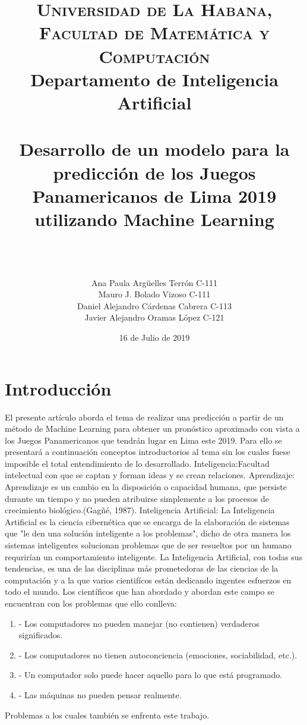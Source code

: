 \documentclass[a4paper,12pt]{article}
\title{	
\normalfont \normalsize 
\textsc{Universidad de La Habana, Facultad de Matem\'{a}tica y Computaci\'{o}n } \\
Departamento de Inteligencia Artificial\\[25pt] %
\horrule{0.5pt} \\[0.4cm] %
\huge Desarrollo de un modelo para la predicci\'{o}n de los Juegos Panamericanos de Lima 2019 utilizando Machine Learning \\ %
\horrule{2pt} \\[0.5cm] %
}
\author{\\\name Ana Paula Arg\"{u}elles Terr\'{o}n C-111
\\
\name Mauro J. Bolado Vizoso C-111
\\ 
\name Daniel Alejandro C\'{a}rdenas Cabrera C-113 
\\
\name Javier Alejandro Oramas L\'{o}pez C-121}
\date{16 de Julio de 2019} %
\begin{document}
\maketitle
\newpage
\section{Introducci\'{o}n}
	\cline{-}El presente art\'{i}culo aborda el tema de realizar una predicci\'{o}n a partir de un m\'{e}todo de Machine Learning para obtener un pron\'{o}stico aproximado con vista a los Juegos Panamericanos que tendr\'{a}n lugar en Lima este 2019.
 	\cline{-} Para ello se presentar\'{a} a continuaci\'{o}n conceptos introductorios al tema sin los cuales fuese imposible el total entendimiento de lo desarrollado.
	\cline{-} Inteligencia:Facultad intelectual con que se captan y forman ideas y se crean  relaciones. 
	\cline{-} Aprendizaje: Aprendizaje es un cambio en la disposici\'{o}n o capacidad humana, que persiste durante un tiempo y no pueden atribuirse simplemente a los procesos de crecimiento biol\'{o}gico.(Gag\~{n}\'{e}, 1987).
	\cline{-} Inteligencia Artificial: La Inteligencia Artificial es la ciencia cibern\'{e}tica que se encarga de la elaboraci\'{o}n de sistemas que "le den una soluci\'{o}n inteligente a los problemas", dicho de otra manera los sistemas inteligentes solucionan problemas que de ser resueltos por un humano requrir\'{i}an un comportamiento inteligente. La Inteligencia Artificial, con todas sus tendencias, es una de las disciplinas m\'{a}s prometedoras de las ciencias de la computaci\'{o}n y a la que varios cientif\'{i}cos est\'{a}n dedicando ingentes esfuerzos en todo el mundo.
	\cline{-} Los cient\'{i}ficos que han abordado y abordan este campo se encuentran con los problemas que ello conlleva:
	\begin{enumerate}
	\item -	Los computadores no pueden manejar (no contienen) verdaderos significados.
	\item -	Los computadores no tienen autoconciencia (emociones, sociabilidad, etc.). 
	\item -	Un computador solo puede hacer aquello para lo que est\'{a} programado.
	\item -	Las m\'{a}quinas no pueden pensar realmente. 
	\end{enumerate}
Problemas a los cuales tambi\'{e}n se enfrenta este trabajo.
\newpage
\end{document}
